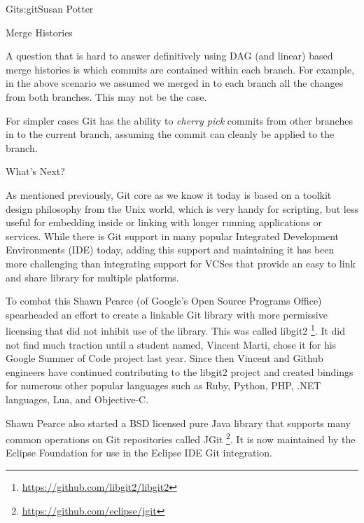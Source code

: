 \begin{aosachapter}{Git}{s:git}{Susan Potter}
\begin{aosasect1}{Merge Histories}

A question that is hard to answer definitively using DAG (and linear) based
merge histories is which commits are contained within each branch. For
example, in the above scenario we assumed we merged in to each branch all
the changes from both branches. This may not be the case.

For simpler cases Git has the ability to \emph{cherry pick} commits from
other branches in to the current branch, assuming the commit can cleanly
be applied to the branch.

\end{aosasect1}

\begin{aosasect1}{What's Next?}

As mentioned previously, Git core as we know it today is based on a toolkit
design philosophy from the Unix world, which is very handy for scripting,
but less useful for embedding inside or linking with longer running
applications or services. While there is Git support in many popular
Integrated Development Environments (IDE) today, adding this support and
maintaining it has been more challenging than integrating support for VCSes
that provide an easy to link and share library for multiple platforms.

To combat this Shawn Pearce (of Google's Open Source Programs Office)
spearheaded an effort to create a linkable Git library with more permissive
licensing that did not inhibit use of the library. This was called libgit2
\footnote{\url{https://github.com/libgit2/libgit2}}.
It did not find much traction until a student named, Vincent Marti, chose it
for his Google Summer of Code project last year. Since then Vincent and
Github engineers have continued contributing to the libgit2 project and
created bindings for numerous other popular languages such as Ruby, Python,
PHP, .NET languages, Lua, and Objective-C.

Shawn Pearce also started a BSD licensed pure Java library that
supports many common operations on Git repositories called JGit
\footnote{\url{https://github.com/eclipse/jgit}}. It is now maintained by
the Eclipse Foundation for use in the Eclipse IDE Git integration.


\end{aosasect1}
\end{aosachapter}
